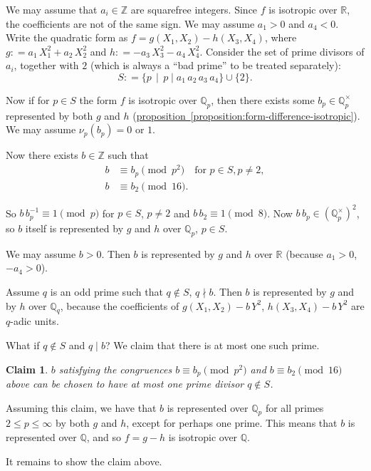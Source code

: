\documentclass{article}
\newcommand{\dfn}{\mathrel{\mathop:}=}
\newcommand{\ZZ}{\mathbb{Z}}
\newcommand{\QQ}{\mathbb{Q}}
\newcommand{\refref}[2]{\hyperref[#2]{#1~\ref*{#2}}}
\theoremstyle{myplain}
\newtheorem*{claim}{Claim}
\theoremstyle{mydefinition}
\begin{document}
We may assume that $a_i \in \ZZ$ are squarefree integers. Since $f$ is isotropic
over $\mathbb{R}$, the coefficients are not of the same sign. We may assume
$a_1 > 0$ and $a_4 < 0$. Write the quadratic form as
$f = g (X_1,X_2) - h (X_3,X_4)$, where $g \dfn a_1 \, X_1^2 + a_2\,X_2^2$ and
$h \dfn -a_3\,X_3^2 - a_4\,X_4^2$. Consider the set of prime divisors of $a_i$,
together with $2$ (which is always a ``bad prime'' to be treated separately):
\[ S \dfn \{ p \,\mid\, p \mid a_1\,a_2\,a_3\,a_4 \} \cup \{ 2 \}. \]

Now if for $p \in S$ the form $f$ is isotropic over $\QQ_p$, then there exists
some $b_p \in \QQ_p^\times$ represented by both $g$ and $h$
(\refref{proposition}{proposition:form-difference-isotropic}). We may assume
$ \nu_p (b_p) = 0 \text{ or } 1$.

Now there exists $b \in \ZZ$ such that
\begin{align*}
  b & \equiv b_p \pmod{p^2} \quad \text{for } p\in S, p \ne 2,\\
  b & \equiv b_2 \pmod{16}.
\end{align*}

So $b\,b_p^{-1} \equiv 1 \pmod{p}$ for $p \in S$, $p \ne 2$ and
$b\,b_2 \equiv 1 \pmod{8}$. Now $b\,b_p \in (\QQ_p^\times)^2$, so $b$ itself is
represented by $g$ and $h$ over $\QQ_p$, $p \in S$.

We may assume $b > 0$. Then $b$ is represented by $g$ and $h$ over $\mathbb{R}$
(because $a_1 > 0$, $-a_4 > 0$).

Assume $q$ is an odd prime such that $q \notin S$, $q \nmid b$. Then $b$ is
represented by $g$ and by $h$ over $\QQ_q$, because the coefficients of
$g (X_1,X_2) - b\,Y^2$, $h (X_3,X_4) - b\,Y^2$ are $q$-adic units.

What if $q \notin S$ and $q \mid b$? We claim that there is at most one such
prime.

\begin{claim}
  $b$ satisfying the congruences $b \equiv b_p \pmod{p^2}$ and
  $b \equiv b_2 \pmod{16}$ above can be chosen to have at most one prime divisor
  $q \notin S$.
\end{claim}

Assuming this claim, we have that $b$ is represented over $\QQ_p$ for all primes
$2 \le p \le \infty$ by both $g$ and $h$, except for perhaps one prime. This
means that $b$ is represented over $\QQ$, and so $f = g - h$ is isotropic over
$\QQ$.

It remains to show the claim above.
\end{document}
